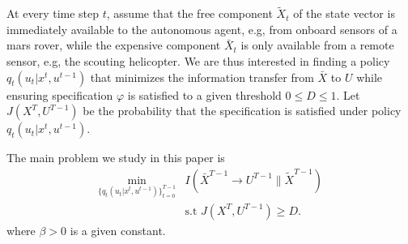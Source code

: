 At every time step $t$, assume that the free component $\tilde{X}_t$ of the state vector is immediately available to the autonomous agent, e.g, from onboard sensors of a mars rover, while the expensive component $\bar{X}_t$ is only available from a remote sensor, e.g, the scouting helicopter. We are thus interested in finding a policy $q_t(u_t|x^t,u^{t-1})$ that minimizes the information transfer from $\bar{X}$ to $U$ while ensuring specification $\varphi$ is satisfied to a given threshold $0 \leq D \leq 1$. Let $J(X^{T},U^{T-1})$ be the probability that the specification is satisfied under policy $q_t(u_t|x^t,u^{t-1})$.



The main problem we study in this paper is
\begin{align}
\min_{\{q_t(u_t|x^t,u^{t-1})\}_{t=0}^{T-1}} & I(\bar{X}^{T-1}\rightarrow U^{T-1}\| \tilde{X}^{T-1}) \nonumber \\
& \textrm{s.t } J(X^{T},U^{T-1}) \geq D. \label{eqmainproblem}
\end{align}
where $\beta>0$ is a given constant.



